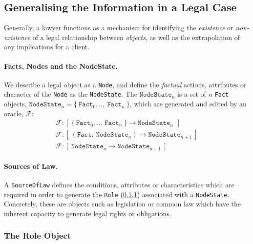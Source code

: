 \documentclass{article}
\numberwithin{equation}{section}
\begin{document}

\subsection{Generalising the Information in a Legal Case}

Generally, a lawyer functions as a mechanism for identifying the \textit{existence} or \textit{non-existence} of a legal relationship between \textit{objects}, as well as the extrapolation of any implications for a client. 

\paragraph{Facts, Nodes and the NodeState.} We describe a legal object as a \texttt{Node}, and define the \textit{factual} actions, attributes or character of the \texttt{Node} as the \texttt{NodeState}. The $\texttt{NodeState}_n$ is a set of $n$ \texttt{Fact} objects, $\texttt{NodeState}_n = \{ \ \texttt{Fact}_0, .., \ \texttt{Fact}_n \ \}$, which are generated and edited by an oracle, $\mathcal{F}$: %
\begin{align}
	\mathcal{F}: [ \ \{ \ \texttt{Fact}_0, .., \ \texttt{Fact}_n \ \} \rightarrow \texttt{NodeState}_n \ \ ] \\
	\mathcal{F}: [ \ (\texttt{Fact}, \ \texttt{NodeState}_n) \rightarrow \texttt{NodeState}_{n+1} \ ] \\
	\mathcal{F}: [ \ \texttt{NodeState}_n \rightarrow \texttt{NodeState}_{n-1} \ ]
\end{align}

\paragraph{Sources of Law.} A \texttt{SourceOfLaw} defines the conditions, attributes or characteristics which are required in order to generate the \texttt{Role} (\ref{section:role-object})  associated with a \texttt{NodeState}. Concretely, these are objects such as legislation or common law which have the inherent capacity to generate legal rights or obligations.


\subsubsection{The Role Object} \label{section:role-object}
\end{document}
